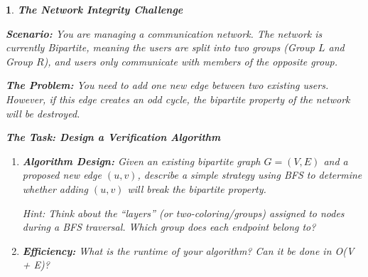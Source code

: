 \documentclass[12pt]{exam}
\theoremstyle{problem}
\newtheorem{p}{}
\begin{document}
\begin{p}
\textbf{The Network Integrity Challenge}

\textbf{Scenario:} You are managing a communication network. The network is currently \emph{Bipartite}, meaning the
users are split into two groups (Group $L$ and Group $R$), and users only communicate with members of the
opposite group.

\begin{center}
\end{center}

\textbf{The Problem:} You need to add one new edge between two existing users. However, if this edge creates
an odd cycle, the bipartite property of the network will be destroyed.

\vspace{0.2cm}

\textbf{The Task: Design a Verification Algorithm}

\begin{enumerate}
    \item \textbf{Algorithm Design:}  
    Given an existing bipartite graph $G = (V, E)$ and a proposed new edge $(u,v)$, describe a
    simple strategy using \textsc{BFS} to determine whether adding $(u,v)$ will break the bipartite property.

    \emph{Hint:} Think about the ``layers'' (or two-coloring/groups) assigned to nodes during a BFS traversal.
    Which group does each endpoint belong to?

    \vspace{7 cm}

    \item \textbf{Efficiency:}  
    What is the runtime of your algorithm? Can it be done in O(V + E)?
\end{enumerate}

\end{p}
\end{document}
